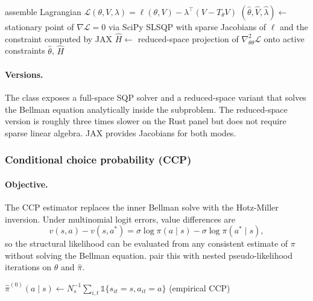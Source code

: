 \begin{algorithm}[H]
\SetAlgoLined
assemble Lagrangian $\mathcal{L}(\theta, V, \lambda) = \ell(\theta, V) - \lambda^\top (V - T_\theta V)$\;
$(\hat\theta, \hat V, \hat\lambda) \leftarrow$ stationary point of $\nabla \mathcal{L} = 0$ via SciPy SLSQP\;
\quad with sparse Jacobians of $\ell$ and the constraint computed by JAX\;
$\hat H \leftarrow$ reduced-space projection of $\nabla^2_{\theta\theta} \mathcal{L}$ onto active constraints\;
\Return $\hat\theta$, $\hat H$\;
\caption{MPEC sequential quadratic programming}
\end{algorithm}

\paragraph{Versions.} The  class exposes a full-space SQP solver and a reduced-space variant that solves the Bellman equation analytically inside the subproblem. The reduced-space version is roughly three times slower on the Rust panel but does not require sparse linear algebra. JAX provides Jacobians for both modes.

\subsubsection{Conditional choice probability (CCP)}

\paragraph{Objective.} The CCP estimator \citep{hotz1993} replaces the inner Bellman solve with the Hotz-Miller inversion. Under multinomial logit errors, value differences are
\begin{equation}
v(s, a) - v(s, a^\ast) = \sigma \log \pi(a \mid s) - \sigma \log \pi(a^\ast \mid s),
\label{eq:hotz}
\end{equation}
so the structural likelihood can be evaluated from any consistent estimate of $\pi$ without solving the Bellman equation. \citet{aguirregabiria2002} pair this with nested pseudo-likelihood iterations on $\theta$ and $\hat\pi$.

\begin{algorithm}[H]
\SetAlgoLined
$\hat\pi^{(0)}(a \mid s) \leftarrow N^{-1}_s \sum_{i,t} \mathbb{1}\{s_{it} = s, a_{it} = a\}$ \quad (empirical CCP)\;
\caption{Nested pseudo-likelihood for CCP}
\end{algorithm}


